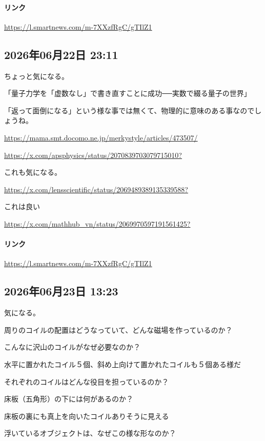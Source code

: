 \paragraph{リンク}
\url{https://l.smartnews.com/m-7XXzfRgC/gTIlZ1}

\subsection*{2026年06月22日 23:11}

ちょっと気になる。

「量子力学を「虚数なし」で書き直すことに成功──実数で綴る量子の世界」

「返って面倒になる」という様な事では無くて、物理的に意味のある事なのでしょうね。

\url{https://mama.smt.docomo.ne.jp/merkystyle/articles/473507/}

\url{https://x.com/apsphysics/status/2070839703079715010?}

これも気になる。

\url{https://x.com/lensscientific/status/2069489389135339588?}

これは良い

\url{https://x.com/mathhub_vn/status/2069970597191561425?}

\paragraph{リンク}
\url{https://l.smartnews.com/m-7XXzfRgC/gTIlZ1}

\subsection*{2026年06月23日 13:23}

気になる。

周りのコイルの配置はどうなっていて、どんな磁場を作っているのか？

こんなに沢山のコイルがなぜ必要なのか？

水平に置かれたコイル５個、斜め上向けて置かれたコイルも５個ある様だ

それぞれのコイルはどんな役目を担っているのか？

床板（五角形）の下には何があるのか？

床板の裏にも真上を向いたコイルありそうに見える

浮いているオブジェクトは、なぜこの様な形なのか？


